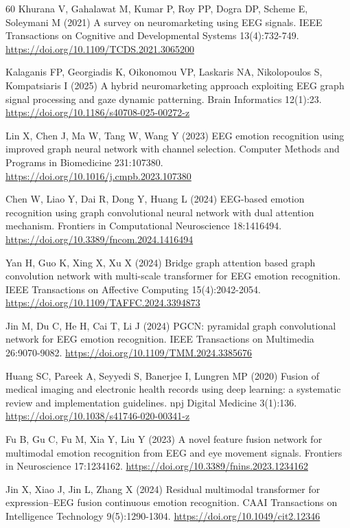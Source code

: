 \begin{thebibliography}{60}
 Khurana V, Gahalawat M, Kumar P, Roy PP, Dogra DP, Scheme E, Soleymani M (2021) A survey on neuromarketing using EEG signals. IEEE Transactions on Cognitive and Developmental Systems 13(4):732-749. \url{https://doi.org/10.1109/TCDS.2021.3065200}

 Kalaganis FP, Georgiadis K, Oikonomou VP, Laskaris NA, Nikolopoulos S, Kompatsiaris I (2025) A hybrid neuromarketing approach exploiting EEG graph signal processing and gaze dynamic patterning. Brain Informatics 12(1):23. \url{https://doi.org/10.1186/s40708-025-00272-z}

 Lin X, Chen J, Ma W, Tang W, Wang Y (2023) EEG emotion recognition using improved graph neural network with channel selection. Computer Methods and Programs in Biomedicine 231:107380. \url{https://doi.org/10.1016/j.cmpb.2023.107380}

 Chen W, Liao Y, Dai R, Dong Y, Huang L (2024) EEG-based emotion recognition using graph convolutional neural network with dual attention mechanism. Frontiers in Computational Neuroscience 18:1416494. \url{https://doi.org/10.3389/fncom.2024.1416494}

 Yan H, Guo K, Xing X, Xu X (2024) Bridge graph attention based graph convolution network with multi-scale transformer for EEG emotion recognition. IEEE Transactions on Affective Computing 15(4):2042-2054. \url{https://doi.org/10.1109/TAFFC.2024.3394873}

 Jin M, Du C, He H, Cai T, Li J (2024) PGCN: pyramidal graph convolutional network for EEG emotion recognition. IEEE Transactions on Multimedia 26:9070-9082. \url{https://doi.org/10.1109/TMM.2024.3385676}

 Huang SC, Pareek A, Seyyedi S, Banerjee I, Lungren MP (2020) Fusion of medical imaging and electronic health records using deep learning: a systematic review and implementation guidelines. npj Digital Medicine 3(1):136. \url{https://doi.org/10.1038/s41746-020-00341-z}

 Fu B, Gu C, Fu M, Xia Y, Liu Y (2023) A novel feature fusion network for multimodal emotion recognition from EEG and eye movement signals. Frontiers in Neuroscience 17:1234162. \url{https://doi.org/10.3389/fnins.2023.1234162}

 Jin X, Xiao J, Jin L, Zhang X (2024) Residual multimodal transformer for expression--EEG fusion continuous emotion recognition. CAAI Transactions on Intelligence Technology 9(5):1290-1304. \url{https://doi.org/10.1049/cit2.12346}


\end{thebibliography}
